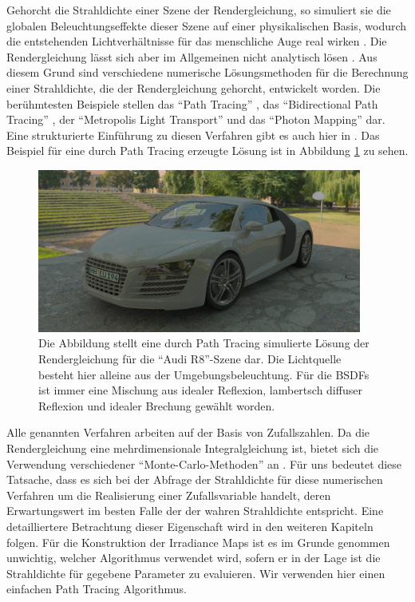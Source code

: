 		Gehorcht die Strahldichte einer Szene der Rendergleichung, so simuliert sie die globalen Beleuchtungseffekte dieser Szene auf einer physikalischen Basis, wodurch die entstehenden Lichtverhältnisse für das menschliche Auge real wirken \cite{kajiya-lte,pbrt3,veach-thesis}.
		Die Rendergleichung lässt sich aber im Allgemeinen nicht analytisch lösen \cite{pbrt3,veach-thesis,kajiya-lte}.
		Aus diesem Grund sind verschiedene numerische Lösungsmethoden für die Berechnung einer Strahldichte, die der Rendergleichung gehorcht, entwickelt worden.
		Die berühmtesten Beispiele stellen das \enquote{Path Tracing} \cite{kajiya-lte}, das \enquote{Bidirectional Path Tracing} \cite{bidirectional-path-tracing}, der \enquote{Metropolis Light Transport} \cite{veach-mlt} und das \enquote{Photon Mapping} \cite{course-photon-map} dar.
		Eine strukturierte Einführung zu diesen Verfahren gibt es auch hier in \cite{pbrt3}.
		Das Beispiel für eine durch Path Tracing erzeugte Lösung ist in Abbildung \ref{fig:example-audi-r8-pt} zu sehen.

		\begin{figure}[h]
			\center
			\includegraphics[width=0.95\textwidth]{pic/example-audi_r8-pt.png}
			\caption[\enquote{Audi R8}-Szene als Beispiel für die Lösung der Rendergleichung durch Path Tracing]{Die Abbildung stellt eine durch Path Tracing simulierte Lösung der Rendergleichung für die \enquote{Audi R8}-Szene dar. Die Lichtquelle besteht hier alleine aus der Umgebungsbeleuchtung. Für die BSDFs ist immer eine Mischung aus idealer Reflexion, lambertsch diffuser Reflexion und idealer Brechung gewählt worden.}
			\label{fig:example-audi-r8-pt}
		\end{figure}

		Alle genannten Verfahren arbeiten auf der Basis von Zufallszahlen.
		Da die Rendergleichung eine mehrdimensionale Integralgleichung ist, bietet sich die Verwendung verschiedener \enquote{Monte-Carlo-Methoden} an \cite{monte-carlo-method}.
		Für uns bedeutet diese Tatsache, dass es sich bei der Abfrage der Strahldichte für diese numerischen Verfahren um die Realisierung einer Zufallsvariable handelt, deren Erwartungswert im besten Falle der der wahren Strahldichte entspricht.
		Eine detailliertere Betrachtung dieser Eigenschaft wird in den weiteren Kapiteln folgen.
		Für die Konstruktion der Irradiance Maps ist es im Grunde genommen unwichtig, welcher Algorithmus verwendet wird, sofern er in der Lage ist die Strahldichte für gegebene Parameter zu evaluieren.
		Wir verwenden hier einen einfachen Path Tracing Algorithmus.

